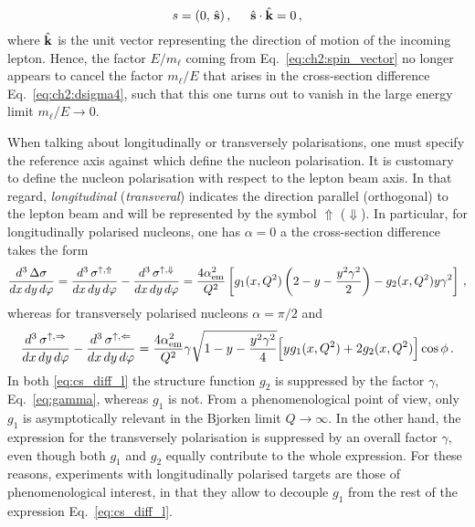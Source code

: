 \begin{equation}
  s = (0,\,\hat{\vb{s}})\,, \hspace{5mm} \hat{\vb{s}} \cdot \hat{\vb{k}} = 0 \,,
\end{equation}
where $\hat{\vb{k}}$ is the unit vector representing the direction of motion of the incoming lepton. Hence, the factor $E/m_{\ell}$ coming from Eq.~\eqref{eq:ch2:spin_vector} no longer appears to cancel the factor $m_{\ell}/E$ that arises in the cross-section difference Eq.~\eqref{eq:ch2:dsigma4}, such that this one turns out to vanish in the large energy limit $m_{\ell}/E \rightarrow 0$. \par
When talking about longitudinally or transversely polarisations, one must specify the reference axis against which define the nucleon polarisation. It is customary to define the nucleon polarisation with respect to the lepton beam axis. In that regard, \textit{longitudinal} (\textit{transveral}) indicates the direction parallel (orthogonal) to the lepton beam and will be represented by the symbol $\Uparrow$ ($\Downarrow$). In particular, for longitudinally polarised nucleons, one has $\alpha=0$ a the cross-section difference takes the form
\begin{equation}
  \frac{d^3 \, \Delta \sigma}{dx \, dy \, d\varphi} = \frac{d^3 \, \sigma^{\uparrow, \Uparrow}}{dx \, dy \, d\varphi} - \frac{d^3 \, \sigma^{\uparrow, \Downarrow}}{dx \, dy \, d\varphi} = \frac{4 \alpha_{\textrm{em}}^2}{Q^2}  \left[ g_1(x,Q^2) \left( 2 - y - \frac{y^2 \gamma^2}{2} \right) - g_2(x,Q^2) y \gamma^2 \right] \,,
  \label{eq:cs_diff_l}
\end{equation}
whereas for transversely polarised nucleons $\alpha=\pi/2$ and
\begin{equation}
  \frac{d^3 \, \sigma^{\uparrow, \Rightarrow}}{dx \, dy \, d\varphi} - \frac{d^3 \, \sigma^{\uparrow, \Leftarrow}}{dx \, dy \, d\varphi} = \frac{4 \alpha_{\textrm{em}}^2}{Q^2} \gamma\sqrt{1 - y - \frac{y^2 \gamma^2}{4}}  \Bigl[ y g_1(x,Q^2) + 2 g_2(x,Q^2) \Bigr] \cos \phi\,.
  \label{eq:cs_diff_t}
\end{equation}
In both \eqref{eq:cs_diff_l} the structure function $g_2$ is suppressed by the factor $\gamma$, Eq.~\eqref{eq:gamma}, whereas $g_1$ is not. From a phenomenological point of view, only $g_1$ is asymptotically relevant in the Bjorken limit $Q \rightarrow \infty$. In the other hand, the expression for the transversely polarisation is suppressed by an overall factor $\gamma$, even though both $g_1$ and $g_2$ equally contribute to the whole expression. For these reasons, experiments with longitudinally polarised targets are those of phenomenological interest, in that they allow to decouple $g_1$ from the rest of the expression Eq.~\eqref{eq:cs_diff_l}.\par
